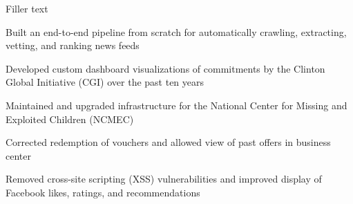 \documentclass{onkursen-resume}
\begin{document}
\begin{itemize*}
\item Filler text
\end{itemize*}
\vspace{-1mm}

\begin{itemize*}
\item Built an end-to-end pipeline from scratch for automatically crawling, extracting, vetting, and ranking news feeds
\end{itemize*}
\vspace{-1mm}

\begin{itemize*}
\item Developed custom dashboard visualizations of commitments by the Clinton Global Initiative (CGI) over the past ten years
\item Maintained and upgraded infrastructure for the National Center for Missing and Exploited Children (NCMEC)
\end{itemize*}
\vspace{-1mm}

\begin{itemize*}
\item Corrected redemption of vouchers and allowed view of past offers in business center
\end{itemize*}
\vspace{-1mm}

\begin{itemize*}
\item Removed cross-site scripting (XSS) vulnerabilities and improved display of Facebook likes, ratings, and recommendations
\end{itemize*}
\vspace{-1mm}
\end{document}
